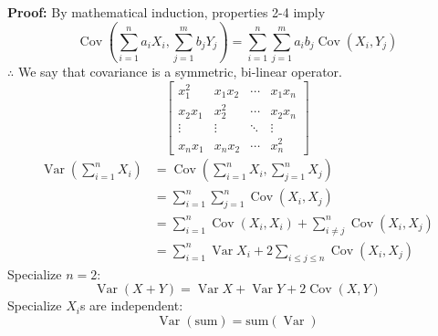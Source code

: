 \documentclass[a4paper]{article}
\newcommand{\n}{\hfill\break}
\newcommand{\pf}[1]{\par\noindent\settowidth{\hangindent}{\textbf{Proof: }}\textbf{Proof: }#1\n}
\DeclareMathOperator{\Var}{Var}
\DeclareMathOperator{\Cov}{Cov}
\begin{document}
\pf{
    By mathematical induction, properties 2-4 imply
    \[\Cov\left(\sum^n_{i=1}a_iX_i, \sum^m_{j=1}b_jY_j\right)=\sum^n_{i=1}\sum^m_{j=1}a_ib_j\Cov(X_i,Y_j)\]
    $\therefore$ We say that covariance is a symmetric, bi-linear operator.
    \[\begin{bmatrix}x_1^2&x_1x_2&\cdots&x_1x_n\\x_2x_1&x_2^2&\cdots&x_2x_n\\\vdots&\vdots&\ddots&\vdots\\x_nx_1&x_nx_2&\cdots&x_n^2\end{bmatrix}\]
    \begin{align*}
        \Var\left(\sum^n_{i=1}X_i\right)&=\Cov\left(\sum^n_{i=1}X_i,\sum^n_{j=1}X_j\right) \\
        &=\sum^n_{i=1}\sum^n_{j=1}\Cov(X_i,X_j) \\
        &=\sum^n_{i=1}\Cov(X_i,X_i)+\sum^n_{i\neq j}\Cov(X_i,X_j) \\
        &=\sum^n_{i=1}\Var X_i+2\sum_{i\leq j\leq n}\Cov(X_i,X_j) 
    \end{align*}
    Specialize $n=2$:
    \[\Var(X+Y)=\Var X+\Var Y+2\Cov(X,Y)\]
    Specialize $X_i$s are independent:
    \[\Var(\text{sum})=\text{sum}(\Var)\]
}
\end{document}
